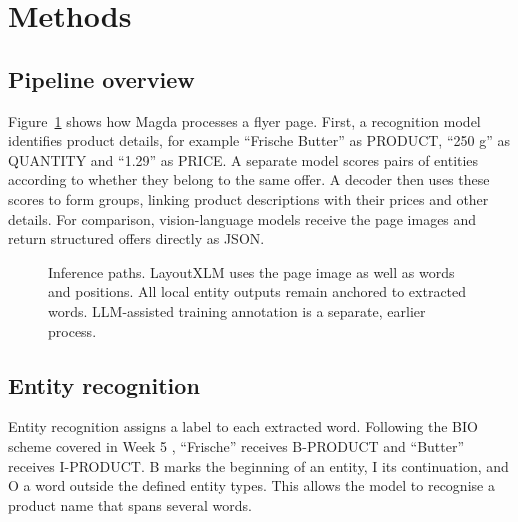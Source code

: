 \section{Methods}\label{sec:methods}
\subsection{Pipeline overview}
Figure~\ref{fig:pipeline} shows how Magda processes a flyer page. First, a recognition model identifies product details, for example ``Frische Butter'' as PRODUCT, ``250 g'' as QUANTITY and ``1.29'' as PRICE. A separate model scores pairs of entities according to whether they belong to the same offer. A decoder then uses these scores to form groups, linking product descriptions with their prices and other details. For comparison, vision-language models receive the page images and return structured offers directly as JSON.

\begin{figure}[htbp]
\centering
{}
\caption{Inference paths. LayoutXLM uses the page image as well as words and positions. All local entity outputs remain anchored to extracted words. LLM-assisted training annotation is a separate, earlier process.}\label{fig:pipeline}
\end{figure}

\subsection{Entity recognition}
Entity recognition assigns a label to each extracted word. Following the BIO scheme covered in Week 5 \citep[p.~8]{iecourse2026}, ``Frische'' receives B-PRODUCT and ``Butter'' receives I-PRODUCT. B marks the beginning of an entity, I its continuation, and O a word outside the defined entity types. This allows the model to recognise a product name that spans several words.


